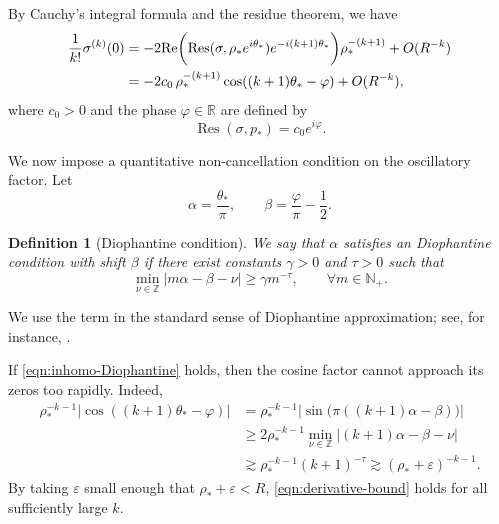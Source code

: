 \documentclass{article}
\numberwithin{equation}{section}
\newtheorem{definition}{Definition}
\def\RR{\mathbb{R}}
\def\ZZ{\mathbb{Z}}
\begin{document}
    By Cauchy's integral formula and the residue theorem, we have
    \begin{equation}
    \begin{split}
        \frac{1}{k!} \sigma^{(k)}(0) &= -2{\rm Re}\bigg({\rm Res}(\sigma,\rho_\ast e^{i\theta_\ast})e^{-i(k+1)\theta_\ast}\bigg)\rho_\ast^{-(k+1)} + O(R^{-k})\\
        &=-2c_0\,\rho_\ast^{-(k+1)}\cos((k+1)\theta_\ast - \varphi) + O(R^{-k}),
    \end{split}
    \end{equation}
    where $c_0>0$ and the phase $\varphi\in\RR$ are defined by
    \[
    \operatorname{Res}(\sigma,p_\ast)=c_0 e^{i\varphi}.
    \]
    
    We now impose a quantitative non-cancellation condition on the oscillatory factor. Let
    \[
    \alpha=\frac{\theta_\ast}{\pi},
    \qquad
    \beta=\frac{\varphi}{\pi}-\frac12.
    \]
    \begin{definition}[Diophantine condition]\label{def:Diophantine}
        We say that $\alpha$ satisfies an \emph{Diophantine condition} with shift $\beta$ if there exist constants $\gamma>0$ and $\tau>0$ such that
        \begin{equation}\label{eqn:inhomo-Diophantine}
        \min_{\nu\in\mathbb Z}|m\alpha - \beta-\nu|
        \geq \gamma m^{-\tau},
        \qquad \forall m\in\mathbb N_+.
        \end{equation}
    \end{definition}
    We use the term in the standard sense of Diophantine approximation; see, for instance, \cite{Cassels1957,BugeaudLaurent2005}.
    
    If \eqref{eqn:inhomo-Diophantine} holds, then the cosine factor cannot approach its zeros too rapidly. Indeed, 
    \begin{equation}
    \begin{split}
        \rho_\ast^{-k-1}|\cos((k+1)\theta_\ast - \varphi)|
        &=\rho_\ast^{-k-1}\big|\sin\big(\pi((k+1)\alpha-\beta)\big)\big|\\
        &\geq 2\rho_\ast^{-k-1}\min_{\nu\in\ZZ}|(k+1)\alpha-\beta-\nu|\\
        &\gtrsim \rho_\ast^{-k-1}(k+1)^{-\tau}
        \gtrsim (\rho_\ast+\varepsilon)^{-k-1}.
    \end{split}
    \end{equation}
    By taking $\varepsilon$ small enough that $\rho_\ast+\varepsilon < R$, \eqref{eqn:derivative-bound} holds for all sufficiently large \(k\).
\end{document}
